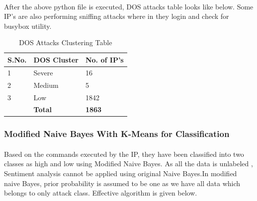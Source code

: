 \documentclass{report}
\begin{document}






\paragraph{}
After the above python file is executed, DOS attacks table looks like below.
Some IP's are also performing sniffing attacks where in they login and check for busybox utility.

\begin{table}[H]
\begin{tabular}{ |p{2cm}|p{5cm}|p{5cm}|  }
 \hline
 \textbf{S.No.} & \textbf{DOS Cluster} & \textbf{No. of IP's}\\
 \hline
 \hline
 1 & Severe & 16 \\
 \hline
2 & Medium & 5 \\
\hline
3 & Low & 1842 \\
\hline
\hline
 & \textbf{Total} & \textbf{1863} \\
\hline
\end{tabular}
 \caption{DOS Attacks Clustering Table}
\end{table}

\subsubsection{Modified Naive Bayes With K-Means for Classification}
\paragraph{}
Based on the commands executed by the IP, they have been classified into two classes as high and low using Modified Naive Bayes. As all the data is unlabeled , Sentiment analysis cannot be applied using original Naive Bayes.In modified naive Bayes, prior probability is assumed to be one as we have all data which belongs to only attack class. Effective algorithm is given below.


\end{document}
